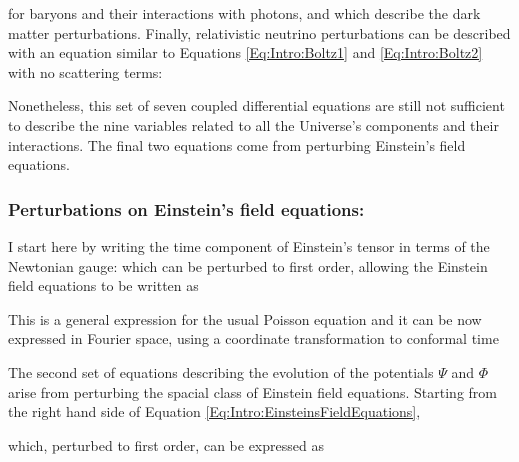 for baryons and their interactions with photons, and
which describe the dark matter perturbations. Finally, relativistic neutrino perturbations can be described with an equation similar to Equations \eqref{Eq:Intro:Boltz1} and \eqref{Eq:Intro:Boltz2} with no scattering terms:

\qquad Nonetheless, this set of seven coupled differential equations are still not sufficient to describe the nine variables related to all the Universe's components and their interactions. The final two equations come from perturbing Einstein's field equations.

\subsubsection{Perturbations on Einstein's field equations:}
I start here by writing the time component of Einstein's tensor in terms of the Newtonian gauge:
which can be perturbed to first order, allowing the Einstein field equations to be written as

This is a general expression for the usual Poisson equation and it can be now expressed in Fourier space, using a coordinate transformation to conformal time \citep[][pages ?? and 123, respectively]{Peacock,dods}


\qquad The second set of equations describing the evolution of the potentials $\Psi$ and $\Phi$ arise from perturbing the spacial class of Einstein field equations. Starting from the right hand side of Equation \eqref{Eq:Intro:EinsteinsFieldEquations},

which, perturbed to first order, can be expressed as


